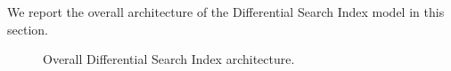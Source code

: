 We report the overall architecture of the Differential Search Index model in this section.

\begin{figure*}
    \centering
    \caption{Overall Differential Search Index architecture.}
    \label{fig:dsi-architecture}
\end{figure*}
